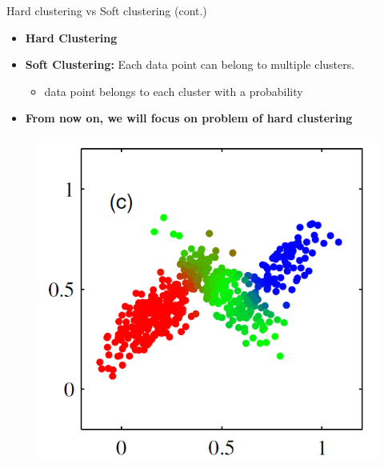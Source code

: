 \documentclass[serif, aspectratio=169]{beamer}
\begin{document}
\begin{frame}{Hard clustering vs Soft clustering (cont.)}
    \begin{minipage}{0.55\textwidth}
        \begin{itemize}
        \item \textbf{Hard Clustering}
        \item \textbf{Soft Clustering:} Each data point can belong to multiple clusters.
        \begin{itemize}
            \item data point belongs to each cluster with a probability
        \end{itemize}
        \item \textbf{From now on, we will focus on problem of hard clustering}
    \end{itemize}
    \end{minipage}%
    \begin{minipage}{0.40\textwidth}
        \begin{figure}
            \centering
            \includegraphics[scale=0.5]{pic/soft_clustering.png}
        \end{figure}
    \end{minipage}
\end{frame}
\end{document}

